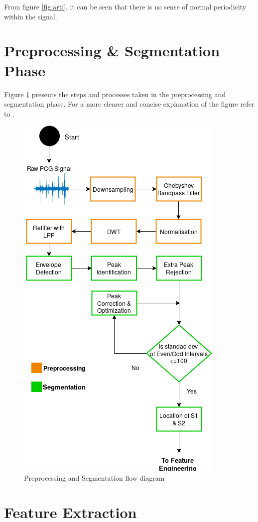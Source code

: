 \documentclass[10pt,twocolumn]{witseiepaper}
\begin{document}
From figure \ref{fig:arti}, it can be seen that there is no sense of normal periodicity within the signal.

\section{Preprocessing \& Segmentation Phase}
\label{app:preseg}
Figure \ref{fig:preseg} presents the steps and processes taken in the preprocessing and segmentation phase. For a more clearer and concise explanation of the figure refer to \cite{love}.
\begin{figure}[h!]
    \centering
    \includegraphics[scale=0.45]{./reportFDfinal.png}
    \caption{Preprocessing and Segmentation flow diagram}
    \label{fig:preseg}
\end{figure}{}

\section{Feature Extraction}
\label{app:features}
\end{document}
